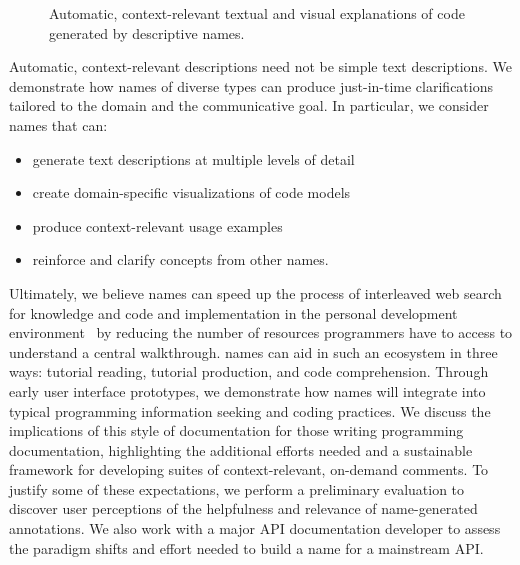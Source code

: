 \begin{figure}[!t]
\label{fig:tutorons}
\caption{Automatic, context-relevant textual and visual explanations of code generated by descriptive \glspl{name}.}
\end{figure}

Automatic, context-relevant descriptions need not be simple text descriptions.
We demonstrate how \glspl{name} of diverse types can produce just-in-time clarifications tailored to the domain and the communicative goal.
In particular, we consider \glspl{name} that can:
\begin{itemize} \itemsep1pt
\item generate text descriptions at multiple levels of detail
\item create domain-specific visualizations of code models
\item produce context-relevant usage examples
\item reinforce and clarify concepts from other \glspl{name}.
\end{itemize}

Ultimately, we believe \glspl{name} can speed up the process of interleaved web search for knowledge and code and implementation in the personal development environment~\cite{brandt} by reducing the number of resources programmers have to access to understand a central walkthrough.
\Glspl{name} can aid in such an ecosystem in three ways: tutorial reading, tutorial production, and code comprehension.
Through early user interface prototypes, we demonstrate how \glspl{name} will integrate into typical programming information seeking and coding practices.
We discuss the implications of this style of documentation for those writing programming documentation, highlighting the additional efforts needed and a sustainable framework for developing suites of context-relevant, on-demand comments.
To justify some of these expectations, we perform a preliminary evaluation to discover user perceptions of the helpfulness and relevance of \gls{name}-generated annotations.
We also work with a major API documentation developer to assess the paradigm shifts and effort needed to build a \gls{name} for a mainstream API.

